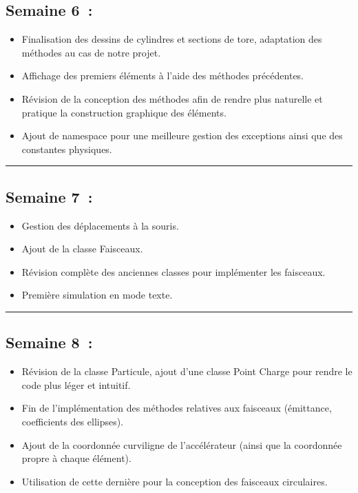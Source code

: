 \documentclass[12pt, letterpaper, twoside]{article}
\begin{document}
\subsection{Semaine 6 :}
\begin{itemize}
\item Finalisation des dessins de cylindres et sections de tore, adaptation des méthodes au cas de notre projet.
\item Affichage des premiers éléments à l'aide des méthodes précédentes.
\item Révision de la conception des méthodes afin de rendre plus naturelle et pratique la construction graphique des éléments.
\item Ajout de namespace pour une meilleure gestion des exceptions ainsi que des constantes physiques.
\end{itemize}

\rule{\textwidth}{0.4pt}

\subsection{Semaine 7 :}
\begin{itemize}
\item Gestion des déplacements à la souris.
\item Ajout de la classe Faisceaux.
\item Révision complète des anciennes classes pour implémenter les faisceaux.
\item Première simulation en mode texte.
\end{itemize}

\rule{\textwidth}{0.4pt}

\subsection{Semaine 8 :}
\begin{itemize}
\item Révision de la classe Particule, ajout d’une classe Point Charge pour rendre le code plus léger et intuitif.
\item Fin de l'implémentation des méthodes relatives aux faisceaux (émittance, coefficients des ellipses).
\item Ajout de la coordonnée curviligne de l’accélérateur (ainsi que la coordonnée propre à chaque élément).
\item Utilisation de cette dernière pour la conception des faisceaux circulaires.
\end{itemize}
\end{document}
